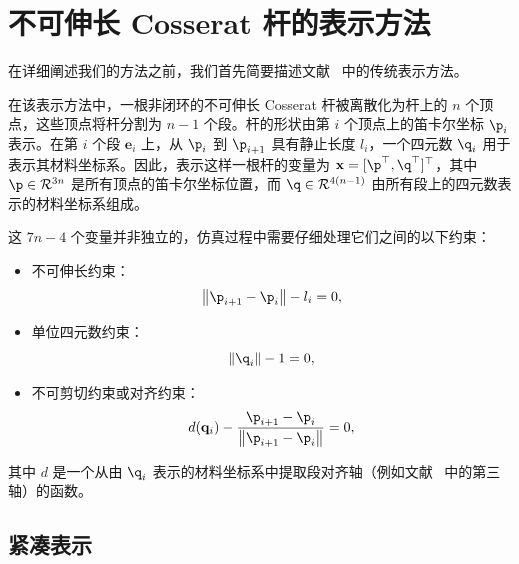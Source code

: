 \section{不可伸长 Cosserat 杆的表示方法}\label{sec: background}

在详细阐述我们的方法之前，我们首先简要描述文献~\cite{spillmann_corde_2007} 中的传统表示方法。

在该表示方法中，一根非闭环的不可伸长 Cosserat 杆被离散化为杆上的 $n$ 个顶点，这些顶点将杆分割为 $n-1$ 个段。杆的形状由第 $i$ 个顶点上的笛卡尔坐标 $\p_i$ 表示。在第 $i$ 个段 $\mathbf{e}_i$ 上，从 $\p_i$ 到 $\p_{i+1}$ 具有静止长度 $l_i$，一个四元数 $\q_i$ 用于表示其材料坐标系。因此，表示这样一根杆的变量为
$\mathbf{x} = [\p^\top, \q^\top]^\top$，其中 $\p\in \mathcal{R}^{3n}$ 是所有顶点的笛卡尔坐标位置，而 $\q\in \mathcal{R}^{4(n-1)}$ 由所有段上的四元数表示的材料坐标系组成。

这 $7n-4$ 个变量并非独立的，仿真过程中需要仔细处理它们之间的以下约束：
\begin{itemize}
\item 不可伸长约束：
\begin{equation}
  \left\| \p_{i+1} - \p_i \right\| - l_i = 0,
  \label{eq: inext_cons_d}
  \end{equation}
\item 单位四元数约束：
\begin{equation}
  \left\| \q_i  \right\| - 1 = 0,
  \label{eq: unitq_cons}
\end{equation}
\item 不可剪切约束或对齐约束：
\begin{equation}
  d(\mathbf q_i) - \frac{\p_{i+1} - \p_i}{\left\| \p_{i+1} - \p_i\right\|} = 0,
  \label{eq: alignment_cons}
\end{equation}
\end{itemize}
其中 $d$ 是一个从由 $\q_i$ 表示的材料坐标系中提取段对齐轴（例如文献~\cite{spillmann_corde_2007} 中的第三轴）的函数。

\subsection{紧凑表示}

